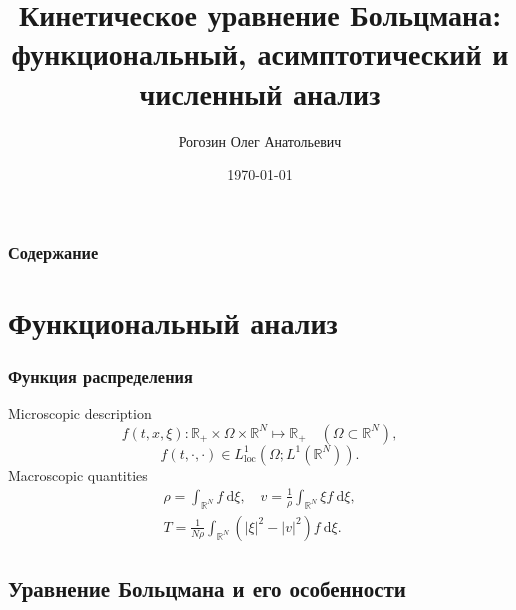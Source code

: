 \documentclass[mathserif]{beamer} %
\title{Кинетическое уравнение Больцмана: функциональный, асимптотический и численный анализ}
\author{Рогозин Олег Анатольевич}
\institute{
    Вычислительный центр ФИЦ ИУ РАН
}
\date{\today}
\newcommand{\loc}{\mathrm{loc}}
\newcommand{\dd}{\:\mathrm{d}}
\newcommand{\dxi}{\dd\xi}
\begin{document}
\frame{\titlepage}

\begin{frame}
  \frametitle{Содержание}
  \linespread{0.8}
  \tableofcontents
\end{frame}

\section{Функциональный анализ}

\begin{frame}
    \frametitle{Функция распределения}
    Microscopic description %
    \begin{equation*}
        f(t,x,\xi): \mathbb{R}_+\times\Omega\times\mathbb{R}^N\mapsto\mathbb{R}_+
        \quad (\Omega\subset\mathbb{R}^N),
    \end{equation*}
    \begin{equation*}
        f(t,\cdot,\cdot) \in L^1_\loc(\Omega; L^1(\mathbb{R}^N)).
    \end{equation*}
    Macroscopic quantities %
    \begin{equation*}
        \begin{gathered}
        \rho = \int_{\mathbb{R}^N} f\dxi, \quad v = \frac1\rho\int_{\mathbb{R}^N} \xi f\dxi, \\
        T = \frac1{N\rho}\int_{\mathbb{R}^N} \left(|\xi|^2 - |v|^2\right) f\dxi.
        \end{gathered}
    \end{equation*}
\end{frame}

\subsection{Уравнение Больцмана и его особенности}
\end{document}
